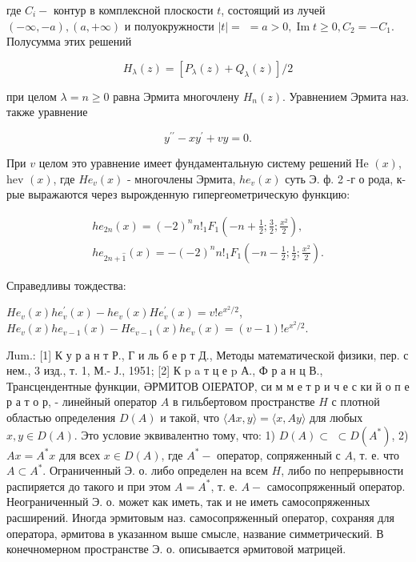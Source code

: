 \documentclass[10pt]{article}
\begin{document}
где $C_{i}-$ контур в комплексной плоскости $t$, состоящий из лучей $(-\infty,-a),(a,+\infty)$ и полуокружности $|t|=$ $=a>0, \operatorname{Im} t \geqslant 0, C_{2}=-C_{1}$. Полусумма этих решений



\[

H_{\lambda}(z)=\left[P_{\lambda}(z)+Q_{\lambda}(z)\right] / 2

\]



при целом $\lambda=n \geqslant 0$ равна Эрмита многочлену $H_{n}(z)$. Уравнением Эрмита наз. также уравнение



\[

y^{\prime \prime}-x y^{\prime}+v y=0 .

\]



При $v$ целом это уравнение имеет фундаментальную систему решений He $(x)$, hev $(x)$, где $H e_{v}(x)$ - многочлены Эрмита, $h e_{v}(x)$ суть Э. ф. 2 -г о рода, к-рые выражаются через вырожденную гипергеометрическую функцию:



\[

\begin{gathered}

h e_{2 n}(x)=(-2)^{n} n !_{1} F_{1}\left(-n+\frac{1}{2} ; \frac{3}{2} ; \frac{x^{2}}{2}\right), \\

h e_{2 n+\hat{1}}(x)=-(-2)^{n} n !_{1} F_{1}\left(-n-\frac{1}{2} ; \frac{1}{2} ; \frac{x^{2}}{2}\right) .

\end{gathered}

\]



Справедливы тождества:



$H e_{v}(x) h e_{v}^{\prime}(x)-h e_{v}(x) H e_{v}^{\prime}(x)=v ! e^{x^{2} / 2}$, $H e_{v}(x) h e_{v-1}(x)-H e_{v-1}(x) h e_{v}(x)=(v-1) ! e^{x^{2} / 2}$.



Лum.: [1] К у р а н т Р., Г и ль б е р т Д., Методы математической физики, пер. с нем., 3 изд., т. 1, М.- Ј., 1951; [2] К p a т ц е p А., Ф р а н ц В., Трансцендентные функции, ӘРМИТОВ ОIЕРАТОР, си м м е т р и ч е с ки й о п е р а т о р, - линейный оператор $A$ в гильбертовом пространстве $H$ с плотной областью определения $D(A)$ и такой, что $\langle A x, y\rangle=\langle x, A y\rangle$ для любых $x, y \in D(A)$. Это условие эквивалентно тому, что: 1) $D(A) \subset$ $\subset D\left(A^{*}\right)$, 2) $A x=A^{*} x$ для всех $x \in D(A)$, где $A^{*}-$ оператор, сопряженный с $A$, т. е. что $A \subset A^{*}$. Ограниченный Э. о. либо определен на всем $H$, либо по непрерывности распиряется до такого и при этом $A=A^{*}$, т. е. $A-$ самосопряженный оператор. Неограниченный Э. о. может как иметь, так и не иметь самосопряженных расширений. Иногда эрмитовым наз. самосопряженный оператор, сохраняя для оператора, әрмитова в указанном выше смысле, название симметрический. В конечномерном пространстве Э. о. описывается әрмитовой матрицей.
\end{document}
